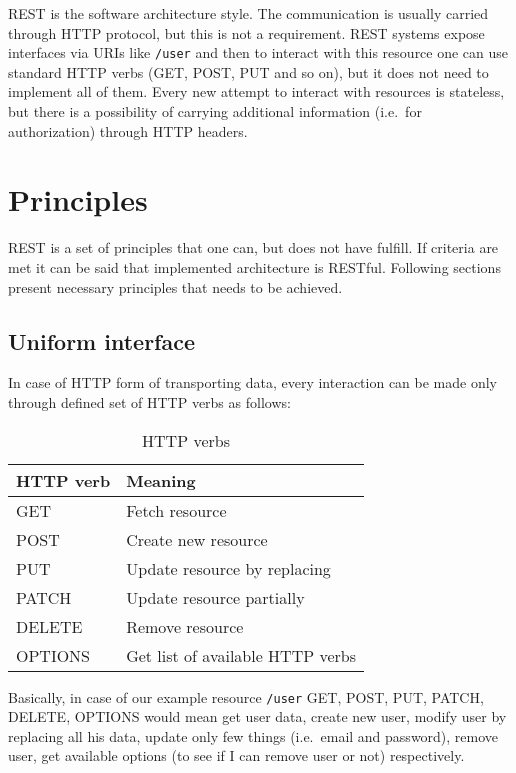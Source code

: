 REST is the software architecture style\cite{REST-wiki}. The communication is usually carried through HTTP protocol, but this is not a requirement. REST systems expose interfaces via URIs like\label{example-URI} \verb|/user| and then to interact with this resource one can use standard HTTP verbs (GET, POST, PUT and so on), but it does not need to implement all of them. Every new attempt to interact with resources is stateless, but there is a possibility of carrying additional information (i.e.\ for authorization) through HTTP headers.

\section{Principles}
REST is a set of principles that one can, but does not have fulfill. If criteria are met it can be said that implemented architecture is RESTful. Following sections present necessary principles that needs to be achieved.

\subsection{Uniform interface}
\label{uniform-interface}
In case of HTTP form of transporting data, every interaction can be made only through defined set of HTTP verbs as follows:

\begin{table}[!htbp]
\centering
\begin{tabular}{ll} \toprule
 HTTP verb &  Meaning \\ \midrule
 GET & Fetch resource \\
 POST & Create new resource \\
 PUT & Update resource by replacing \\
 PATCH & Update resource partially \\
 DELETE & Remove resource \\
 OPTIONS & Get list of available HTTP verbs \\ \bottomrule
\end{tabular}
\caption{HTTP verbs}
\label{tab:http-verbs}
\end{table}

Basically, in case of our example resource \verb|/user| GET, POST, PUT, PATCH, DELETE, OPTIONS would mean get user data, create new user, modify user by replacing all his data, update only few things (i.e.\ email and password), remove user, get available options (to see if I can remove user or not) respectively.

